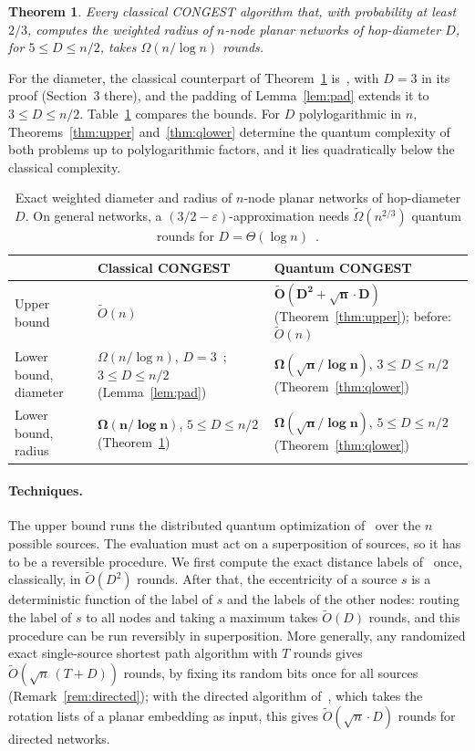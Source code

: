 \documentclass[11pt]{article}
\newtheorem{theorem}{Theorem}[section]
\theoremstyle{definition}
\theoremstyle{remark}
\newcommand{\Ot}{\tilde O}
\begin{document}
\begin{theorem}\label{thm:clower}
Every classical CONGEST algorithm that, with probability at least $2/3$, computes the weighted radius of $n$-node planar networks of hop-diameter $D$, for $5\le D\le n/2$, takes $\Omega(n/\log n)$ rounds.
\end{theorem}

For the diameter, the classical counterpart of Theorem~\ref{thm:clower} is~\cite[Theorem~9]{ACK20}, with $D=3$ in its proof (Section~3 there), and the padding of Lemma~\ref{lem:pad} extends it to $3\le D\le n/2$. Table~\ref{tab:results} compares the bounds. For $D$ polylogarithmic in $n$, Theorems~\ref{thm:upper} and~\ref{thm:qlower} determine the quantum complexity of both problems up to polylogarithmic factors, and it lies quadratically below the classical complexity.

\begin{table}[h]
\centering
\footnotesize
\renewcommand{\arraystretch}{1.25}
\begin{tabular}{@{}p{2.3cm}p{5.4cm}p{6.6cm}@{}}
\toprule
& Classical CONGEST & Quantum CONGEST\\
\midrule
Upper bound & $\Ot(n)$~\cite{BN19} & $\mathbf{\Ot(D^2+\sqrt n\cdot D)}$ (Theorem~\ref{thm:upper}); before: $\Ot(n)$\\
Lower bound, diameter & $\Omega(n/\log n)$, $D=3$~\cite{ACK20}; $3\le D\le n/2$ (Lemma~\ref{lem:pad}) & $\mathbf{\Omega(\sqrt n/\log n)}$, $3\le D\le n/2$ (Theorem~\ref{thm:qlower})\\
Lower bound, radius & $\mathbf{\Omega(n/\log n)}$, $5\le D\le n/2$ (Theorem~\ref{thm:clower}) & $\mathbf{\Omega(\sqrt n/\log n)}$, $5\le D\le n/2$ (Theorem~\ref{thm:qlower})\\
\bottomrule
\end{tabular}
\caption{Exact weighted diameter and radius of $n$-node planar networks of hop-diameter $D$. On general networks, a $(3/2-\varepsilon)$-approximation needs $\tilde\Omega(n^{2/3})$ quantum rounds for $D=\Theta(\log n)$~\cite{WY22}.}
\label{tab:results}
\end{table}

\paragraph{Techniques.} The upper bound runs the distributed quantum optimization of~\cite{LM18} over the $n$ possible sources. The evaluation must act on a superposition of sources, so it has to be a reversible procedure. We first compute the exact distance labels of~\cite{LP19} once, classically, in $\Ot(D^2)$ rounds. After that, the eccentricity of a source $s$ is a deterministic function of the label of $s$ and the labels of the other nodes: routing the label of $s$ to all nodes and taking a maximum takes $\Ot(D)$ rounds, and this procedure can be run reversibly in superposition. More generally, any randomized exact single-source shortest path algorithm with $T$ rounds gives $\Ot(\sqrt n\,(T+D))$ rounds, by fixing its random bits once for all sources (Remark~\ref{rem:directed}); with the directed algorithm of~\cite{Sen26}, which takes the rotation lists of a planar embedding as input, this gives $\Ot(\sqrt n\cdot D)$ rounds for directed networks.
\end{document}
